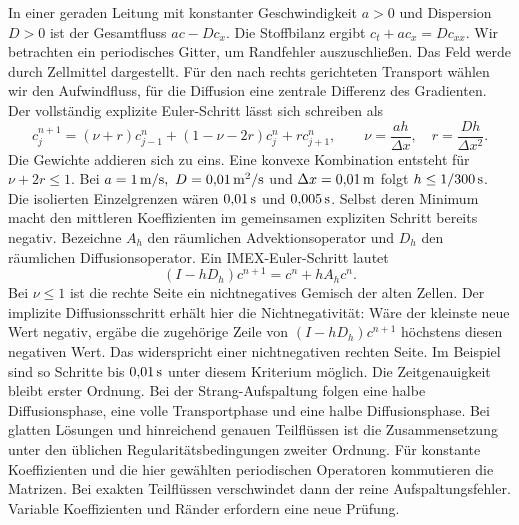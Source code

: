 In einer geraden Leitung mit konstanter Geschwindigkeit \(a>0\) und Dispersion \(D>0\) ist der Gesamtfluss \(ac-Dc_x\). Die Stoffbilanz ergibt \(c_t+ac_x=Dc_{xx}\). Wir betrachten ein periodisches Gitter, um Randfehler auszuschließen. Das Feld werde durch Zellmittel dargestellt. Für den nach rechts gerichteten Transport wählen wir den Aufwindfluss, für die Diffusion eine zentrale Differenz des Gradienten.
Der vollständig explizite Euler-Schritt lässt sich schreiben als
\[
 c_j^{n+1}=(\nu+r)c_{j-1}^n+(1-\nu-2r)c_j^n+r c_{j+1}^n,\qquad
 \nu=\frac{a h}{\Delta x},\quad r=\frac{Dh}{\Delta x^2}.
\]
Die Gewichte addieren sich zu eins. Eine konvexe Kombination entsteht für \(\nu+2r\le1\). Bei \(a=1\unitm{m/s},\ D=0{,}01\unitm{m^2/s}\) und \(\Delta x=0{,}01\,\mathrm{m}\) folgt \(h\le1/300\,\mathrm{s}\). Die isolierten Einzelgrenzen wären \(0{,}01\,\mathrm{s}\) und \(0{,}005\,\mathrm{s}\). Selbst deren Minimum macht den mittleren Koeffizienten im gemeinsamen expliziten Schritt bereits negativ.
Bezeichne \(A_h\) den räumlichen Advektionsoperator und \(D_h\) den räumlichen Diffusionsoperator. Ein IMEX-Euler-Schritt lautet
\[
 (I-hD_h)c^{n+1}=c^n+hA_h c^n .
\]
Bei \(\nu\le1\) ist die rechte Seite ein nichtnegatives Gemisch der alten Zellen. Der implizite Diffusionsschritt erhält hier die Nichtnegativität: Wäre der kleinste neue Wert negativ, ergäbe die zugehörige Zeile von \((I-hD_h)c^{n+1}\) höchstens diesen negativen Wert. Das widerspricht einer nichtnegativen rechten Seite. Im Beispiel sind so Schritte bis \(0{,}01\,\mathrm{s}\) unter diesem Kriterium möglich. Die Zeitgenauigkeit bleibt erster Ordnung.
Bei der Strang-Aufspaltung folgen eine halbe Diffusionsphase, eine volle Transportphase und eine halbe Diffusionsphase. Bei glatten Lösungen und hinreichend genauen Teilflüssen ist die Zusammensetzung unter den üblichen Regularitätsbedingungen zweiter Ordnung. Für konstante Koeffizienten und die hier gewählten periodischen Operatoren kommutieren die Matrizen. Bei exakten Teilflüssen verschwindet dann der reine Aufspaltungsfehler. Variable Koeffizienten und Ränder erfordern eine neue Prüfung.


